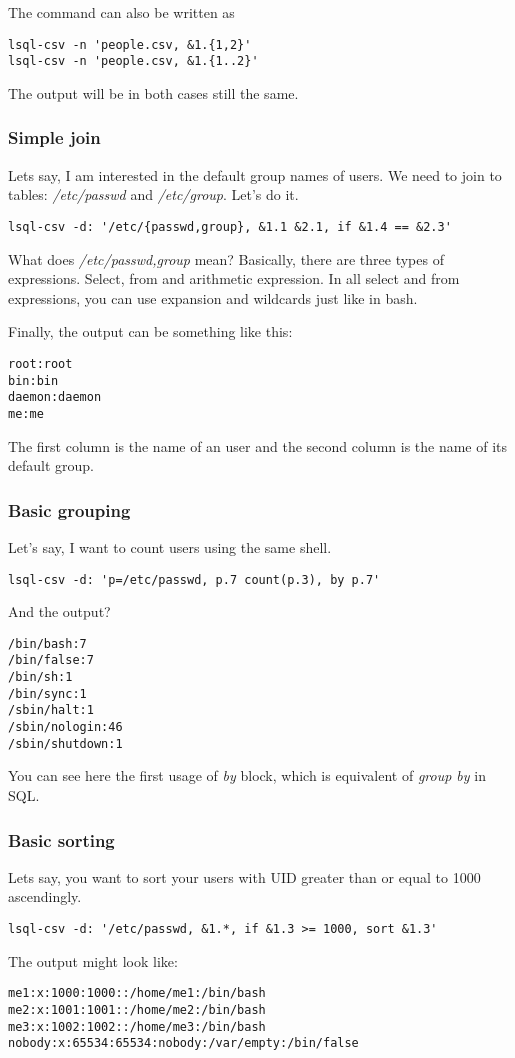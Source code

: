 The command can also be written as
\begin{verbatim}
lsql-csv -n 'people.csv, &1.{1,2}'
lsql-csv -n 'people.csv, &1.{1..2}'
\end{verbatim}
The output will be in both cases still the same.


\subsubsection{Simple join}
Lets say, I am interested in the default group names of users. We need to join to tables: \textit{/etc/passwd} and \textit{/etc/group}. Let's do it.
\begin{verbatim}
lsql-csv -d: '/etc/{passwd,group}, &1.1 &2.1, if &1.4 == &2.3'
\end{verbatim}
What does \textit{/etc/{passwd,group}} mean? Basically, there are three types of expressions. Select, from and arithmetic expression. In all select and from expressions, you can use expansion and wildcards just like in bash.

Finally, the output can be something like this:
\begin{verbatim}
root:root
bin:bin
daemon:daemon
me:me
\end{verbatim}
The first column is the name of an user and the second column is the name of its default group.


\subsubsection{Basic grouping}
Let's say, I want to count users using the same shell.
\begin{verbatim}
lsql-csv -d: 'p=/etc/passwd, p.7 count(p.3), by p.7'
\end{verbatim}
And the output?
\begin{verbatim}
/bin/bash:7
/bin/false:7
/bin/sh:1
/bin/sync:1
/sbin/halt:1
/sbin/nologin:46
/sbin/shutdown:1
\end{verbatim}

You can see here the first usage of \textit{by} block, which is equivalent of \textit{group by} in SQL.

\subsubsection{Basic sorting}
Lets say, you want to sort your users with UID greater than or equal to 1000 ascendingly.
\begin{verbatim}
lsql-csv -d: '/etc/passwd, &1.*, if &1.3 >= 1000, sort &1.3'
\end{verbatim}
The output might look like:
\begin{verbatim}
me1:x:1000:1000::/home/me1:/bin/bash
me2:x:1001:1001::/home/me2:/bin/bash
me3:x:1002:1002::/home/me3:/bin/bash
nobody:x:65534:65534:nobody:/var/empty:/bin/false
\end{verbatim}

